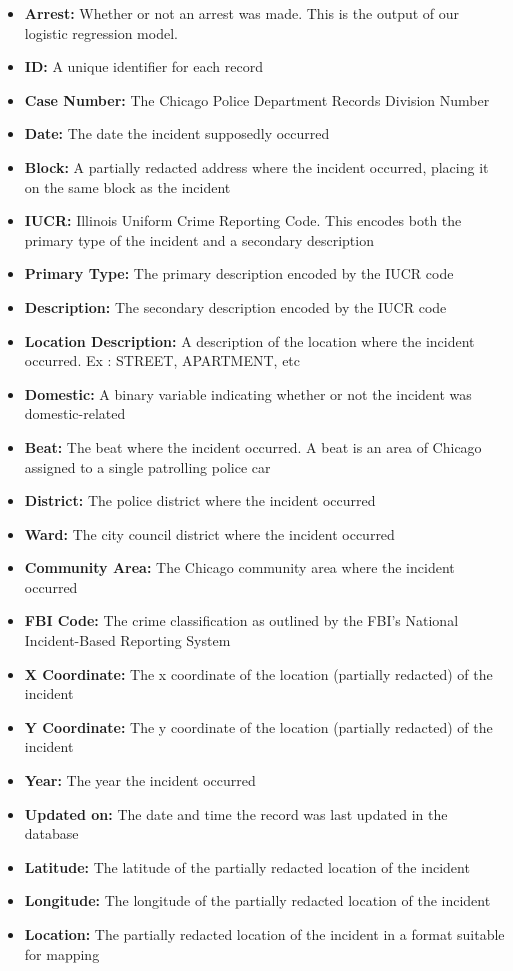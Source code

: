 \documentclass[10pt]{SelfArx} %
\begin{document}
    \begin{itemize}
        \item \textbf{Arrest:} Whether or not an arrest was made. This is the output of our logistic regression model.
        \item \textbf{ID:} A unique identifier for each record
        \item \textbf{Case Number:} The Chicago Police Department Records Division Number
        \item \textbf{Date:} The date the incident supposedly occurred
        \item \textbf{Block:} A partially redacted address where the incident occurred, placing it on the same block as the incident
        \item \textbf{IUCR:} Illinois Uniform Crime Reporting Code. This encodes both the primary type of the incident and a secondary description
        \item \textbf{Primary Type:} The primary description encoded by the IUCR code
        \item \textbf{Description:} The secondary description encoded by the IUCR code
        \item \textbf{Location Description:} A description of the location where the incident occurred. Ex : STREET, APARTMENT, etc
        \item \textbf{Domestic:} A binary variable indicating whether or not the incident was domestic-related
        \item \textbf{Beat:} The beat where the incident occurred. A beat is an area of Chicago assigned to a single patrolling police car
        \item \textbf{District:} The police district where the incident occurred
        \item \textbf{Ward:} The city council district where the incident occurred
        \item \textbf{Community Area:} The Chicago community area where the incident occurred
        \item \textbf{FBI Code:} The crime classification as outlined by the FBI’s National Incident-Based Reporting System
        \item \textbf{X Coordinate:} The x coordinate of the location (partially redacted) of the incident
        \item \textbf{Y Coordinate:} The y coordinate of the location (partially redacted) of the incident
        \item \textbf{Year:} The year the incident occurred
        \item \textbf{Updated on:} The date and time the record was last updated in the database
        \item \textbf{Latitude:} The latitude of the partially redacted location of the incident
        \item \textbf{Longitude:} The longitude of the partially redacted location of the incident
        \item \textbf{Location:} The partially redacted location of the incident in a format suitable for mapping
    \end{itemize}
\end{document}

